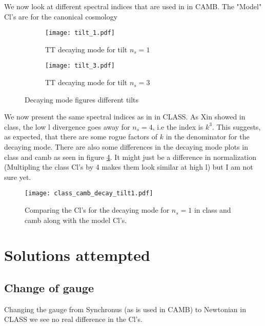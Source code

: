 \documentclass[12pt]{article}
\numberwithin{equation}{section}
\begin{document}
\newpage 

We now look at different spectral indices that are used in \cite{Amendola:2004rt} in CAMB. The "Model" Cl's are for the canonical cosmology

\begin{figure}[ht]\centering
        \begin{subfigure}{.5\textwidth}
               \texttt{[image: tilt\_1.pdf]}
               \caption{TT decaying mode for tilt $n_s =1$}
                \label{fig:P1} 
        \end{subfigure}%
        \begin{subfigure}{.5\textwidth}
                \texttt{[image: tilt\_3.pdf]}
                \caption{TT decaying mode for tilt $n_s =3$}
                \label{fig:P2}
        \end{subfigure}
       \caption{Decaying mode figures different tilts} \label{fig:growing mode}
\end{figure}

We now present the same spectral indices as in \cite{Amendola:2004rt} in CLASS. As Xin showed in class, the low l divergence goes away for $n_s = 4$, i.e the index is $k^3$. 
This suggests, as expected, that there are some rogue factors of $k$ in the denominator for the decaying mode.
There are also some differences in the decaying mode plots in class and camb as seen in figure \ref{cvsc}. It might just be a difference in normalization (Multipling the class Cl's by 4 makes them look similar at high l) but I am not sure yet. 

\begin{figure}[h!]
\begin{center}
\texttt{[image: class\_camb\_decay\_tilt1.pdf]}
\vspace{5mm}
\caption{Comparing the Cl's for the decaying mode for $n_s=1$ in class and camb along with the model Cl's. }
\label{cvsc}
\end{center}
\end{figure}

\section{Solutions attempted}

\subsection{Change of gauge}

Changing the gauge from Synchronus (as is used in CAMB) to Newtonian in CLASS we see no real difference in the Cl's.
\end{document}

